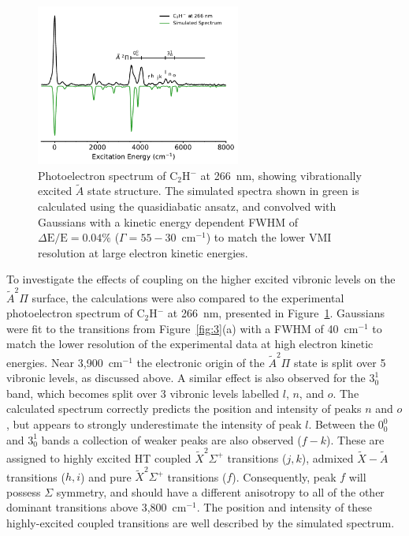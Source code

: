 \documentclass[journal=jpcafh,manuscript=article,layout=onecolumn, 12pt]{achemso}
\begin{document}
\begin{figure}[th!]
	\includegraphics[width=0.6\textwidth]{figures/266-plot.pdf}
	\caption{Photoelectron spectrum of C$_2$H$^-$ at 266~nm, showing vibrationally excited $\tilde{A}$ state structure. The simulated spectra shown in green is calculated using the quasidiabatic ansatz, and convolved with Gaussians with a kinetic energy dependent FWHM of $\Delta\text{E}/\text{E} = 0.04\%$ ($\Gamma=55-30$~cm$^{-1}$) to match the lower VMI resolution at large electron kinetic energies.}
	\label{fig:4}
\end{figure}
To investigate the effects of coupling on the higher excited vibronic levels on the $\tilde{A} ^2\Pi$ surface, the calculations were also compared to the experimental photoelectron spectrum of C$_2$H$^-$ at 266~nm, presented in Figure~\ref{fig:4}. Gaussians were fit to the transitions from Figure~\ref{fig:3}(a) with a FWHM of 40~cm$^{-1}$ to match the lower resolution of the experimental data at high electron kinetic energies. Near 3,900~cm$^{-1}$ the electronic origin of the $\tilde{A} ^2\Pi$ state is split over 5 vibronic levels, as discussed above. A similar effect is also observed for the $3^1_0$ band, which becomes split over 3 vibronic levels labelled $l$, $n$, and $o$. The calculated spectrum correctly predicts the position and intensity of peaks $n$ and $o$, but appears to strongly underestimate the intensity of peak $l$. Between the $0^0_0$ and $3^1_0$ bands a collection of weaker peaks are also observed ($f-k$). These are assigned to highly excited HT coupled $\tilde{X} ^2\Sigma^+$ transitions ($j,k$), admixed $\tilde{X}-\tilde{A}$ transitions ($h,i$) and pure $\tilde{X} ^2\Sigma^+$ transitions ($f$). Consequently, peak $f$ will possess $\Sigma$ symmetry, and should have a different anisotropy to all of the other dominant transitions above 3,800~cm$^{-1}$. The position and intensity of these highly-excited coupled transitions are well described by the simulated spectrum. 
\end{document}

